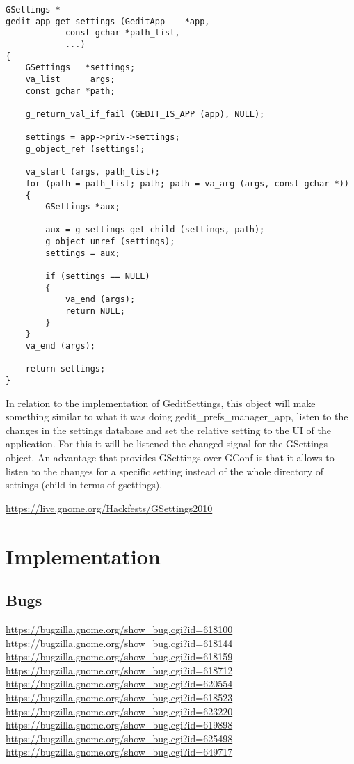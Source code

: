 \begin{lstlisting}[style=GObject]
GSettings *
gedit_app_get_settings (GeditApp    *app,
			const gchar *path_list,
			...)
{
	GSettings   *settings;
	va_list      args;
	const gchar *path;

	g_return_val_if_fail (GEDIT_IS_APP (app), NULL);

	settings = app->priv->settings;
	g_object_ref (settings);

	va_start (args, path_list);
	for (path = path_list; path; path = va_arg (args, const gchar *))
	{
		GSettings *aux;

		aux = g_settings_get_child (settings, path);
		g_object_unref (settings);
		settings = aux;

		if (settings == NULL)
		{
			va_end (args);
			return NULL;
		}
	}
	va_end (args);

	return settings;
}
\end{lstlisting}

In relation to the implementation of GeditSettings, this object will make something similar to what it was doing gedit\_prefs\_manager\_app, listen to the changes in the settings database and set the relative setting to the UI of the application. For this it will be listened the changed signal for the GSettings object. An advantage that provides GSettings over GConf is that it allows to listen to the changes for a specific setting instead of the whole directory of settings (child in terms of gsettings).

\url{https://live.gnome.org/Hackfests/GSettings2010}

\section{Implementation}

\subsection{Bugs}

\noindent\url{https://bugzilla.gnome.org/show_bug.cgi?id=618100}\\
\noindent\url{https://bugzilla.gnome.org/show_bug.cgi?id=618144}\\
\noindent\url{https://bugzilla.gnome.org/show_bug.cgi?id=618159}\\
\noindent\url{https://bugzilla.gnome.org/show_bug.cgi?id=618712}\\
\noindent\url{https://bugzilla.gnome.org/show_bug.cgi?id=620554}\\
\noindent\url{https://bugzilla.gnome.org/show_bug.cgi?id=618523}\\
\noindent\url{https://bugzilla.gnome.org/show_bug.cgi?id=623220}\\
\noindent\url{https://bugzilla.gnome.org/show_bug.cgi?id=619898}\\
\noindent\url{https://bugzilla.gnome.org/show_bug.cgi?id=625498}\\
\noindent\url{https://bugzilla.gnome.org/show_bug.cgi?id=649717}
